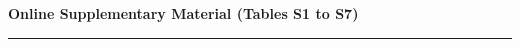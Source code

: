 \documentclass[11pt,a4paper]{article}
\begin{document}
\thispagestyle{empty}
\noindent\parbox[t][0.45in][b]{\paperwidth}{%
  \centering
  {\footnotesize\bfseries\sffamily\color{accent} Online Supplementary Material (Tables S1 to S7)}\\[2pt]
  {\color{accent}\rule{\dimexpr\paperwidth-1.5in\relax}{0.6pt}}%
}
\end{document}
